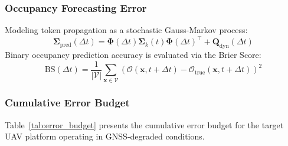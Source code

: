 \subsubsection{Occupancy Forecasting Error}
Modeling token propagation as a stochastic Gauss-Markov process:
\begin{equation}
  \mathbf{\Sigma}_{\text{pred}}(\Delta t) = \mathbf{\Phi}(\Delta t) \mathbf{\Sigma}_k(t) \mathbf{\Phi}(\Delta t)^\top + \mathbf{Q}_{\text{dyn}}(\Delta t)
\end{equation}
Binary occupancy prediction accuracy is evaluated via the Brier Score:
\begin{equation}
  \mathrm{BS}(\Delta t) = \frac{1}{|\mathcal{V}|} \sum_{\mathbf{x} \in \mathcal{V}} \left( \mathcal{O}(\mathbf{x}, t+\Delta t) - \mathcal{O}_{\text{true}}(\mathbf{x}, t+\Delta t) \right)^2
\end{equation}

\subsubsection{Cumulative Error Budget}
Table~\ref{tab:error_budget} presents the cumulative error budget for the target UAV platform operating in GNSS-degraded conditions.

